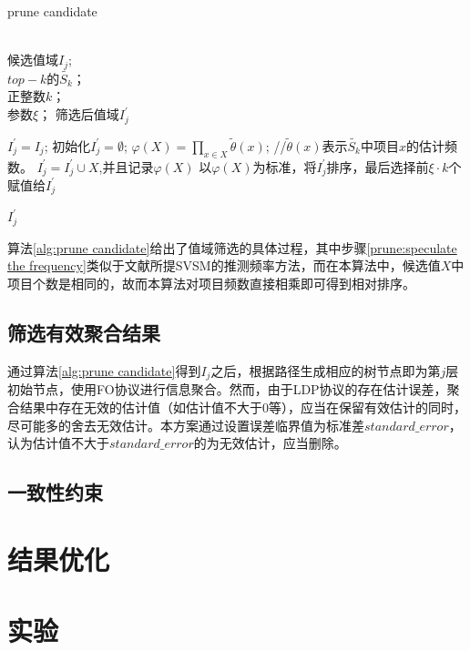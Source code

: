 \documentclass[UTF8]{ctexart}
\begin{document}
\begin{algorithm}[h]
\caption{prune candidate}
\label{alg:prune candidate}
\begin{algorithmic}[1]
\REQUIRE ~~\\
候选值域$I_{j}$;\\
$top-k$的$\tilde{S_k}$；\\
正整数$k$；\\
参数$\xi$；
\ENSURE 筛选后值域$I^{\prime}_{j}$

    \STATE $I^{\prime}_{j} = I_{j}$;
\ELSE
    \STATE 初始化$I^{\prime}_{j} = \emptyset$;
        \STATE $\varphi(X)=\prod_{x \in X} \tilde{\theta}(x)$;    //$\tilde{\theta}(x)$表示$\tilde{S_k}$中项目$x$的估计频数。\label{prune:speculate the frequency}
        \STATE $I^{\prime}_{j} = I^{\prime}_{j} \cup X$,并且记录$\varphi(X)$
    \ENDFOR
    \STATE 以$\varphi(X)$为标准，将$I^{\prime}_{j}$排序，最后选择前$\xi \cdot k$个赋值给$I^{\prime}_{j}$
\ENDIF

\RETURN $I^{\prime}_{j}$
\end{algorithmic}
\end{algorithm}

  算法\ref{alg:prune candidate}给出了值域筛选的具体过程，其中步骤\ref{prune:speculate the frequency}类似于文献\cite{wang2018locally}所提SVSM的推测频率方法，而在本算法中，候选值$X$中项目个数是相同的，故而本算法对项目频数直接相乘即可得到相对排序。

\subsection{筛选有效聚合结果}
  通过算法\ref{alg:prune candidate}得到$I_j$之后，根据路径生成相应的树节点即为第$j$层初始节点，使用FO协议进行信息聚合。然而，由于LDP协议的存在估计误差，聚合结果中存在无效的估计值（如估计值不大于0等），应当在保留有效估计的同时，尽可能多的舍去无效估计。本方案通过设置误差临界值为标准差$standard\_error$，认为估计值不大于$standard\_error$的为无效估计，应当删除。

\subsection{一致性约束}

\section{结果优化}
\label{section:optimize}

\section{实验}
\end{document}
